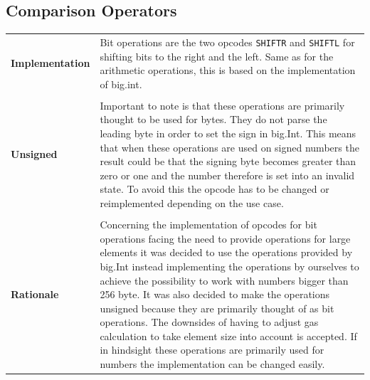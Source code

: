 \subsection{Comparison Operators}
\begin{tabular}[t]{ p{3cm} p{12.5cm}}
\raggedright
\textbf{Implementation} &
Bit operations are the two opcodes \texttt{SHIFTR} and \texttt{SHIFTL} for shifting bits to the right and the left. Same as for the arithmetic operations, this is based on the implementation of big.int. \\ \\

\raggedright
\textbf{Unsigned} &
Important to note is that these operations are primarily thought to be used for bytes. They do not parse the leading byte in order to set the sign in big.Int. This means that when these operations are used on signed numbers the result could be that the signing byte becomes greater than zero or one and the number therefore is set into an invalid state. To avoid this the opcode has to be changed or reimplemented depending on the use case. \\ \\

\raggedright
\textbf{Rationale} &
Concerning the implementation of opcodes for bit operations facing the need to provide operations for large elements it was decided to use the operations provided by big.Int instead implementing the operations by ourselves to achieve the possibility to work with numbers bigger than 256 byte. It was also decided to make the operations unsigned because they are primarily thought of as bit operations. The downsides of having to adjust gas calculation to take element size into account is accepted. If in hindsight these operations are primarily used for numbers the implementation can be changed easily. 
\end{tabular}

